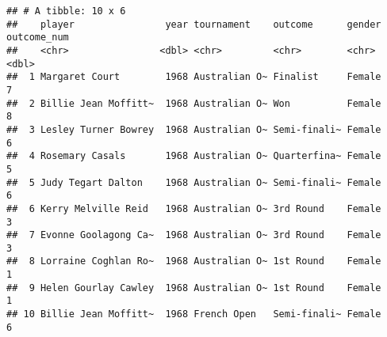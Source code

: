 \documentclass[]{article}
\newenvironment{Shaded}{\begin{snugshade}}{\end{snugshade}}
\newcommand{\KeywordTok}[1]{\textcolor[rgb]{0.13,0.29,0.53}{\textbf{#1}}}
\newcommand{\DataTypeTok}[1]{\textcolor[rgb]{0.13,0.29,0.53}{#1}}
\newcommand{\DecValTok}[1]{\textcolor[rgb]{0.00,0.00,0.81}{#1}}
\newcommand{\StringTok}[1]{\textcolor[rgb]{0.31,0.60,0.02}{#1}}
\newcommand{\OperatorTok}[1]{\textcolor[rgb]{0.81,0.36,0.00}{\textbf{#1}}}
\newcommand{\NormalTok}[1]{#1}
\begin{document}
\begin{Shaded}
\end{Shaded}

\begin{verbatim}
## # A tibble: 10 x 6
##    player                year tournament    outcome      gender outcome_num
##    <chr>                <dbl> <chr>         <chr>        <chr>        <dbl>
##  1 Margaret Court        1968 Australian O~ Finalist     Female           7
##  2 Billie Jean Moffitt~  1968 Australian O~ Won          Female           8
##  3 Lesley Turner Bowrey  1968 Australian O~ Semi-finali~ Female           6
##  4 Rosemary Casals       1968 Australian O~ Quarterfina~ Female           5
##  5 Judy Tegart Dalton    1968 Australian O~ Semi-finali~ Female           6
##  6 Kerry Melville Reid   1968 Australian O~ 3rd Round    Female           3
##  7 Evonne Goolagong Ca~  1968 Australian O~ 3rd Round    Female           3
##  8 Lorraine Coghlan Ro~  1968 Australian O~ 1st Round    Female           1
##  9 Helen Gourlay Cawley  1968 Australian O~ 1st Round    Female           1
## 10 Billie Jean Moffitt~  1968 French Open   Semi-finali~ Female           6
\end{verbatim}
\end{document}
